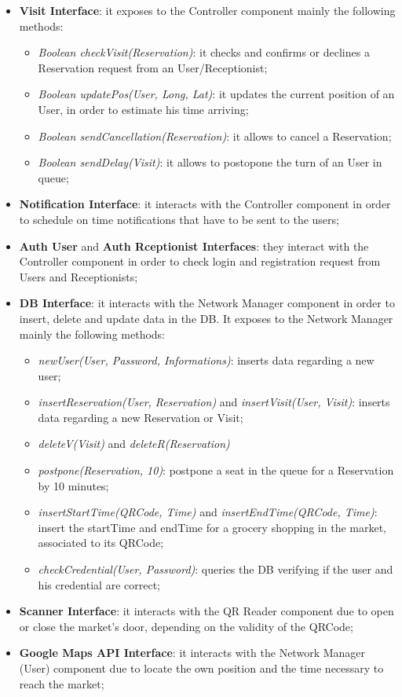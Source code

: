 \begin{itemize}
\item \textbf{Visit Interface}: it exposes to the Controller component mainly the following methods:
\begin{itemize}
\item \textit{Boolean checkVisit(Reservation)}: it checks and confirms or declines a Reservation request from an User/Receptionist;
\item \textit{Boolean updatePos(User, Long, Lat)}: it updates the current position of an User, in order to estimate his time arriving;
\item \textit{Boolean sendCancellation(Reservation)}: it allows to cancel a Reservation; 
\item \textit{Boolean sendDelay(Visit)}: it allows to postopone the turn of an User in queue;
\end{itemize}


\item \textbf{Notification Interface}: it interacts with the Controller component in order to schedule on time notifications that have to be sent to the users;

\item \textbf{Auth User} and \textbf{Auth Rceptionist Interfaces}: they interact with the Controller component in order to check login and registration request from Users and Receptionists;

\item \textbf{DB Interface}: it interacts with the Network Manager component in order to insert, delete and update data in the DB. It exposes to the Network Manager mainly the following methods:
\begin{itemize}
\item \textit{newUser(User, Password, Informations)}: inserts data regarding a new user;
\item \textit{insertReservation(User, Reservation)} and \textit{insertVisit(User, Visit)}: inserts data regarding a new Reservation or Visit;
\item \textit{deleteV(Visit)} and \textit{deleteR(Reservation)}
\item \textit{postpone(Reservation, 10)}: postpone a seat in the queue for a Reservation by 10 minutes;
\item \textit{insertStartTime(QRCode, Time)} and  \textit{insertEndTime(QRCode, Time)}: insert the startTime and endTime for a grocery shopping in the market, associated to its QRCode;
\item \textit{checkCredential(User, Password)}: queries the DB verifying if the user and his credential are correct;
\end{itemize}

\item \textbf{Scanner Interface}: it interacts with the QR Reader component due to open or close the market's door, depending on the validity of the QRCode;

\item \textbf{Google Maps API Interface}: it interacts with the Network Manager (User) component due to locate the own position and the time necessary to reach the market;

\end{itemize}

